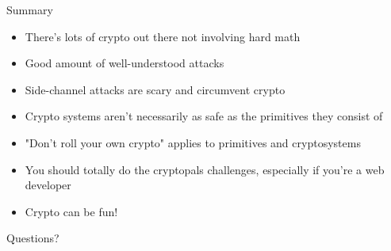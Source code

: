 \documentclass[presentation]{beamer}
\begin{document}
\begin{frame}[label={sec:orgd743485}]{Summary}
\begin{itemize}
\item There's lots of crypto out there not involving hard math
\item Good amount of well-understood attacks
\item Side-channel attacks are scary and circumvent crypto
\item Crypto systems aren't necessarily as safe as the primitives they
consist of
\item "Don't roll your own crypto" applies to primitives \alert{and}
cryptosystems
\item You should totally do the cryptopals challenges, especially if
you're a web developer
\item Crypto can be fun!
\end{itemize}
\end{frame}

\begin{frame}[label={sec:org339c960}]{Questions?}
\end{frame}
\end{document}
